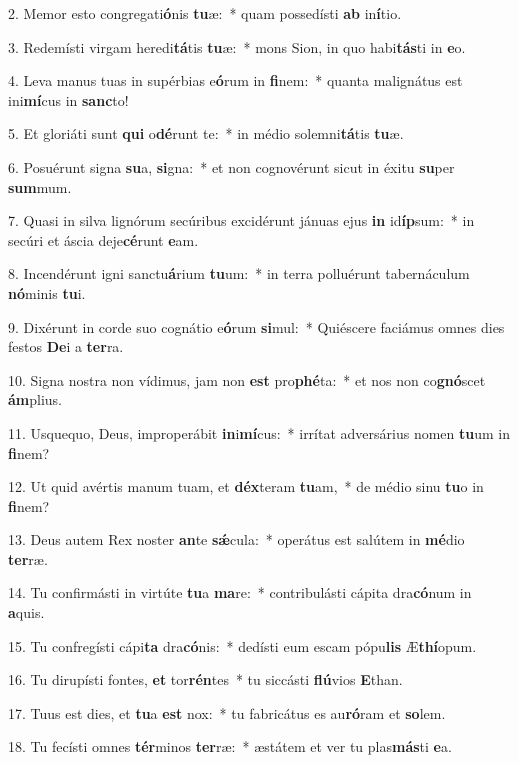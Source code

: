 2. Memor esto congregati\textbf{ó}nis \textbf{tu}æ:~*  quam possedísti \textbf{ab} in\textbf{í}tio.\

3. Redemísti virgam heredi\textbf{tá}tis \textbf{tu}æ:~*  mons Sion, in quo habi\textbf{tás}ti in \textbf{e}o.\

4. Leva manus tuas in supérbias e\textbf{ó}rum in \textbf{fi}nem:~*  quanta malignátus est ini\textbf{mí}cus in \textbf{sanc}to!\

5. Et gloriáti sunt \textbf{qui} o\textbf{dé}runt te:~*  in médio solemni\textbf{tá}tis \textbf{tu}æ.\

6. Posuérunt signa \textbf{su}a, \textbf{si}gna:~*  et non cognovérunt sicut in éxitu \textbf{su}per \textbf{sum}mum.\

7. Quasi in silva lignórum secúribus excidérunt jánuas ejus \textbf{in} id\textbf{íp}sum:~*  in secúri et áscia deje\textbf{cé}runt \textbf{e}am.\

8. Incendérunt igni sanctu\textbf{á}rium \textbf{tu}um:~*  in terra polluérunt tabernáculum \textbf{nó}minis \textbf{tu}i.\

9. Dixérunt in corde suo cognátio e\textbf{ó}rum \textbf{si}mul:~*  Quiéscere faciámus omnes dies festos \textbf{De}i a \textbf{ter}ra.\

10. Signa nostra non vídimus, jam non \textbf{est} pro\textbf{phé}ta:~*  et nos non co\textbf{gnó}scet \textbf{ám}plius.\

11. Usquequo, Deus, improperábit \textbf{in}i\textbf{mí}cus:~*  irrítat adversárius nomen \textbf{tu}um in \textbf{fi}nem?\

12. Ut quid avértis manum tuam, et \textbf{déx}teram \textbf{tu}am,~*  de médio sinu \textbf{tu}o in \textbf{fi}nem?\

13. Deus autem Rex noster \textbf{an}te \textbf{sǽ}cula:~*  operátus est salútem in \textbf{mé}dio \textbf{ter}ræ.\

14. Tu confirmásti in virtúte \textbf{tu}a \textbf{ma}re:~*  contribulásti cápita dra\textbf{có}num in \textbf{a}quis.\

15. Tu confregísti cápi\textbf{ta} dra\textbf{có}nis:~*  dedísti eum escam pópu\textbf{lis} Æ\textbf{thí}opum.\

16. Tu dirupísti fontes, \textbf{et} tor\textbf{rén}tes~*  tu siccásti \textbf{flú}vios \textbf{E}than.\

17. Tuus est dies, et \textbf{tu}a \textbf{est} nox:~*  tu fabricátus es au\textbf{ró}ram et \textbf{so}lem.\

18. Tu fecísti omnes \textbf{tér}minos \textbf{ter}ræ:~*  æstátem et ver tu plas\textbf{más}ti \textbf{e}a.\

